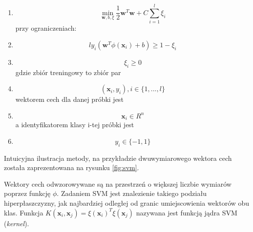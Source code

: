 \begin{enumerate}[label=\arabic*)]
  \item \rule{0pt}{1pt}\vspace*{-12pt}
    \begin{equation*} 
     \min_{\bm{w},b,\xi} \frac{1}{2} \bm{w}^T\bm{w} + C\sum_{i=1}^{l} \xi_{i}
    \end{equation*}
    przy ograniczeniach:
  \item \rule{0pt}{1pt}\vspace*{-12pt}
  	\begin{equation*} 
     {l}y_{i}(\bm{w}^{T}\phi(\bm{x}_i)+b)\geq 1-\xi_{i}
    \end{equation*}
   \item \rule{0pt}{1pt}\vspace*{-12pt}
  	\begin{equation*} 
     \xi_{i} \geq 0
   	\end{equation*}
   	gdzie zbiór treningowy to zbiór par
  \item \rule{0pt}{1pt}\vspace*{-12pt}
  	\begin{equation*} 
     (\bm{x}_i, y_i), i \in \{1, ..., l\}
   	\end{equation*}
   	wektorem cech dla danej próbki jest
   	\item \rule{0pt}{1pt}\vspace*{-12pt}
  	\begin{equation*} 
     \bm{x}_i \in R^n
   	\end{equation*}
   	a identyfikatorem klasy i-tej próbki jest
   	\item \rule{0pt}{1pt}\vspace*{-12pt}
  	\begin{equation*} 
     y_i \in \{-1, 1\}
   	\end{equation*}
\end{enumerate}

Intuicyjna ilustracja metody, na przykładzie dwuwymiarowego wektora cech została zaprezentowana na rysunku \ref{fig:svm}.

Wektory cech odwzorowywane są na przestrzeń o większej liczbie wymiarów poprzez funkcję $\phi$. Zadaniem SVM jest znalezienie takiego podziału hiperpłaszczyzny, jak najbardziej odległej od granic umiejscowienia wektorów obu klas. Funkcja $K(\bm{x}_i, \bm{x}_j) = \xi(\bm{x}_i)^T\xi(\bm{x}_j)$ nazywana jest funkcją jądra SVM (\textit{kernel}).

